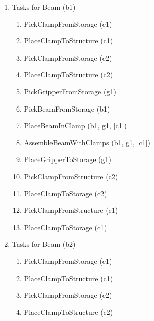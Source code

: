 \documentclass[11pt]{book}
\begin{document}
\begin{enumerate}
	\item {\footnotesize Tasks for Beam (b1) }

\begin{enumerate}
	\item {\footnotesize PickClampFromStorage (c1)}

	\item {\footnotesize PlaceClampToStructure (c1)}

	\item {\footnotesize PickClampFromStorage (c2)}

	\item {\footnotesize PlaceClampToStructure (c2)}

	\item {\footnotesize PickGripperFromStorage (g1)}

	\item {\footnotesize PickBeamFromStorage (b1)}

	\item {\footnotesize PlaceBeamInClamp (b1, g1, [c1])}

	\item {\footnotesize AssembleBeamWithClamps (b1, g1, [c1])}

	\item {\footnotesize PlaceGripperToStorage (g1)}

	\item {\footnotesize PickClampFromStructure (c2)}

	\item {\footnotesize PlaceClampToStorage (c2)}

	\item {\footnotesize PickClampFromStructure (c1)}

	\item {\footnotesize PlaceClampToStorage (c1)}

\end{enumerate}
	\item {\footnotesize Tasks for Beam (b2) }

\begin{enumerate}
	\item {\footnotesize PickClampFromStorage (c1)}

	\item {\footnotesize PlaceClampToStructure (c1)}

	\item {\footnotesize PickClampFromStorage (c2)}

	\item {\footnotesize PlaceClampToStructure (c2)}


\end{enumerate}
\end{enumerate}
\end{document}

